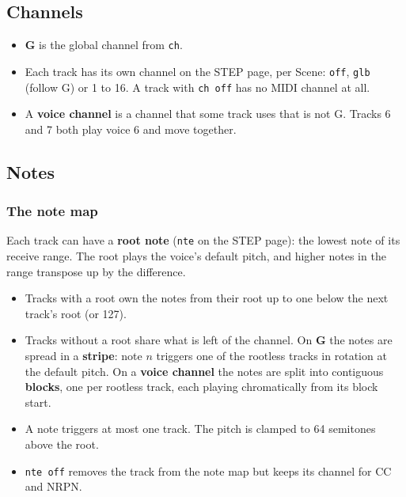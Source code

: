 \subsection{Channels}\label{channels}

\begin{itemize}
\tightlist
\item
  \textbf{G} is the global channel from \texttt{ch}.
\item
  Each track has its own channel on the STEP page, per Scene:
  \texttt{off}, \texttt{glb} (follow G) or 1 to 16. A track with
  \texttt{ch\ off} has no MIDI channel at all.
\item
  A \textbf{voice channel} is a channel that some track uses that is not
  G. Tracks 6 and 7 both play voice 6 and move together.
\end{itemize}

\subsection{Notes}\label{notes}

\subsubsection{The note map}\label{the-note-map}

Each track can have a \textbf{root note} (\texttt{nte} on the STEP
page): the lowest note of its receive range. The root plays the voice's
default pitch, and higher notes in the range transpose up by the
difference.

\begin{itemize}
\tightlist
\item
  Tracks with a root own the notes from their root up to one below the
  next track's root (or 127).
\item
  Tracks without a root share what is left of the channel. On \textbf{G}
  the notes are spread in a \textbf{stripe}: note \(n\) triggers one of
  the rootless tracks in rotation at the default pitch. On a
  \textbf{voice channel} the notes are split into contiguous
  \textbf{blocks}, one per rootless track, each playing chromatically
  from its block start.
\item
  A note triggers at most one track. The pitch is clamped to 64
  semitones above the root.
\item
  \texttt{nte\ off} removes the track from the note map but keeps its
  channel for CC and NRPN.
\end{itemize}

